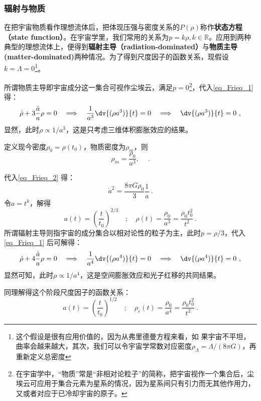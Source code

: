 \subsubsection{辐射与物质}
在把宇宙物质看作理想流体后，把体现压强与密度关系的$P(\rho)$称作\textbf{状态方程（state function）}。在宇宙学里，我们常用的关系为$p=k\rho,k\in \mathbb R$。应用到两种典型的理想流体上，便得到\textbf{辐射主导（radiation-dominated）}与\textbf{物质主导(matter-dominated)}两种情况。为了得到尺度因子的函数关系，现假设$k=\Lambda=0$\footnote{这个假设是很有应用价值的，因为从弗里德曼方程来看，如 果宇宙不平坦，曲率会越来越大，其次，我们可以令宇宙学常数对应密度$\rho_{\Lambda}=\Lambda/(8\pi G)$，再重新定义总密度}。

所谓物质主导即宇宙成分这一集合可视作尘埃云，满足$p=0$\footnote{在宇宙学中，“物质”常是“非相对论粒子”的简称，把宇宙视作一个集合后，尘埃云可应用于集合元素为星系的情况，因为星系间只有引力而无其他作用力，又或者对应于已冷却宇宙的原子。}，代入\autoref{eq_Frieq_1} 得：
\begin{equation}\dot{\rho}+3\frac{\dot{a}}{a}\rho=0\quad\Longrightarrow\quad\frac1{a^3}\dv{(\rho a^3)}{t}=0\quad\Longrightarrow\quad\dv{(\rho a^3)}{t}=0 ~,\end{equation}
显然，此时$\rho\propto 1/a^3$，这是只考虑三维体积膨胀效应的结果。

定义现今密度$\rho_0=\rho(t_0)$，物质密度为$\rho_m$，则
\begin{equation}
\rho_m=\frac{\rho_0}{a^3},\quad ~.
\end{equation}

代入\autoref{eq_Frieq_2} 得：
\begin{equation}
\dot{a}^2=\frac{8\pi G\rho_0}3\frac1a ~.
\end{equation}
令$a=t^k$，解得
\begin{equation}a(t)=\left(\frac{t}{t_0}\right)^{2/3}\quad;\quad\rho(t)=\frac{\rho_0}{a^3}=\frac{\rho_0t_0^2}{t^2}~.\end{equation}
所谓辐射主导则指宇宙的成分集合以相对论性的粒子为主，此时$p=\rho/3$，代入\autoref{eq_Frieq_1} 后可解得：
\begin{equation}\dot{\rho}+4\frac{\dot{a}}{a}\rho=0\quad\Longrightarrow\quad\frac1{a^4}\dv{(\rho a^4)}{t}=0\quad\Longrightarrow\quad\dv{(\rho a^4)}{t} =0~,\end{equation}
显然可知，此时$\rho\propto  1/a^4$，这是空间膨胀效应和光子红移的共同结果。

同理解得这个阶段尺度因子的函数关系：
\begin{equation}
a(t)=\left(\frac{t}{t_0}\right)^{1/2}\quad;\quad\rho_r(t)=\frac{\rho_0}{a^4}=\frac{\rho_0t_0^2}{t^2} ~.
\end{equation}

